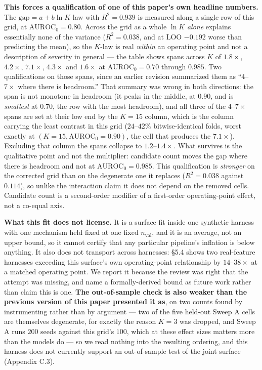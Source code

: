 \documentclass[10pt]{article} %
\begin{document}
\textbf{This forces a qualification of one of this paper's own headline
numbers.} The $\text{gap}=a+b\ln K$ law with $R^2=0.939$ is measured along a
single row of this grid, at $\text{AUROC}_0=0.80$. Across the grid as a whole
$\ln K$ \emph{alone} explains essentially none of the variance ($R^2=0.038$,
and at LOO $-0.192$ worse than predicting the mean), so the $K$-law is real
\emph{within} an operating point and not a description of severity in general
--- the table shows spans across $K$ of $1.8\times$, $4.2\times$, $7.1\times$,
$4.3\times$ and $1.6\times$ at $\text{AUROC}_0=0.70$ through $0.985$. Two
qualifications on those spans, since an earlier revision summarized them as
``$4$--$7\times$ where there is headroom.'' That summary was wrong in both
directions: the span is not monotone in headroom (it peaks in the middle, at
$0.90$, and is \emph{smallest} at $0.70$, the row with the most headroom), and
all three of the $4$--$7\times$ spans are set at their low end by the $K=15$
column, which is the column carrying the least contrast in this grid
($24$--$42\%$ bitwise-identical folds, worst exactly at $(K{=}15,
\text{AUROC}_0{=}0.90)$, the cell that produces the $7.1\times$). Excluding
that column the spans collapse to $1.2$--$1.4\times$. What survives is the
qualitative point and not the multiplier: candidate count moves the gap where
there is headroom and not at $\text{AUROC}_0=0.985$. This qualification is
\emph{stronger} on the corrected grid than on the degenerate one it replaces
($R^2=0.038$ against $0.114$), so unlike the interaction claim it does not
depend on the removed cells. Candidate count is a second-order modifier of a
first-order operating-point effect, not a co-equal axis.

\textbf{What this fit does not license.} It is a surface fit inside one
synthetic harness with one mechanism held fixed at one fixed $n_{\text{val}}$,
and it is an average, not an upper bound, so it cannot certify that any
particular pipeline's inflation is below anything. It also does not transport
across harnesses: §5.4 shows two real-feature harnesses exceeding this
surface's own operating-point relationship by $14$--$38\times$ at a matched
operating point. We report it because the review was right that the attempt was
missing, and name a formally-derived bound as future work rather than claim
this is one. \textbf{The out-of-sample check is also weaker than the previous
version of this paper presented it as}, on two counts found by instrumenting
rather than by argument --- two of the five held-out Sweep A cells are
themselves degenerate, for exactly the reason $K=3$ was dropped, and Sweep A
runs $200$ seeds against this grid's $100$, which at these effect sizes matters
more than the models do --- so we read nothing into the resulting ordering, and
this harness does not currently support an out-of-sample test of the joint
surface (Appendix C.3).
\end{document}
